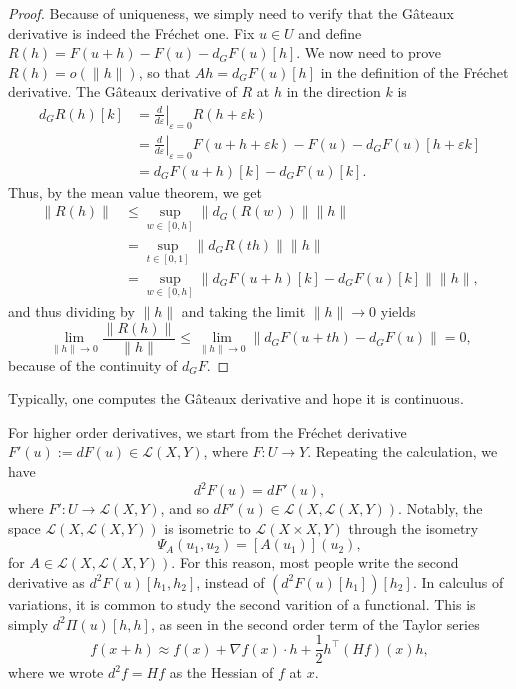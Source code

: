\begin{proof}
    Because of uniqueness, we simply need to verify that the Gâteaux derivative is indeed the Fréchet one. Fix $u\in U$ and define $R(h) = F(u+h) - F(u) - d_G F(u)[h]$. We now need to prove $R(h)=o(\|h\|)$, so that $Ah=d_G F(u)[h]$ in the definition of the Fréchet derivative. The Gâteaux derivative of $R$ at $h$ in the direction $k$ is
    \begin{align*}
        d_G R(h)[k] &= \left.\frac{d}{d\varepsilon}\right|_{\varepsilon = 0} R(h+\varepsilon k) \\
        & = \left.\frac{d}{d\varepsilon}\right|_{\varepsilon = 0} F(u+h+\varepsilon k) - F(u) - d_G F(u)[h + \varepsilon k] \\
        & = d_G F(u+h)[k] - d_G F(u)[k].
    \end{align*}    
    Thus, by the mean value theorem, we get
    \begin{align*}
        \|R(h)\| &\leq \sup_{w\in [0,h]} \|d_G(R(w))\| \|h\|\\
        &=    \sup_{t\in [0,1]} \|d_G R(th)\| \|h\|\\
        &=    \sup_{w\in [0,h]} \|d_G F(u+h)[k] - d_G F(u)[k]\| \|h\|,
    \end{align*}
    and thus dividing by $\|h\|$ and taking the limit $\|h\|\to 0$ yields
    \begin{equation*}
        \lim_{\|h\|\to 0} \frac{\|R(h)\|}{\|h\|} \leq \lim_{\|h\|\to 0} \|d_G F(u+th) - d_G F(u)\| = 0,
    \end{equation*}    
    because of the continuity of $d_G F$.
\end{proof}
Typically, one computes the Gâteaux derivative and hope it is continuous.


For higher order derivatives, we start from the Fréchet derivative $F'(u) := dF(u)\in \mathcal{L}(X,Y)$, where $F:U\to Y$. Repeating the calculation, we have
\begin{equation*}
    d^2 F(u) = dF'(u), 
\end{equation*} 
where $F': U\to \mathcal{L}(X,Y)$, and so $dF'(u) \in \mathcal{L}(X, \mathcal{L}(X,Y))$. Notably, the space $\mathcal{L}(X, \mathcal{L}(X,Y))$ is isometric to $\mathcal{L}(X\times X,Y)$ through the isometry
\begin{equation*}
    \Psi_A(u_1,u_2) = [A(u_1)](u_2),
\end{equation*} 
for $A\in \mathcal{L}(X,\mathcal{L}(X,Y))$. For this reason, most people write the second derivative as $d^2 F(u) [h_1,h_2]$, instead of $(d^2 F(u)[h_1])[h_2]$. In calculus of variations, it is common to study the second varition of a functional. This is simply $d^2 \Pi(u)[h,h]$, as seen in the second order term of the Taylor series
\begin{equation*}
    f(x+h)\approx f(x) + \nabla f(x) \cdot h + \frac{1}{2} h^\top (Hf)(x) h,
\end{equation*} 
where we wrote $d^2 f = Hf$ as the Hessian of $f$ at $x$.

